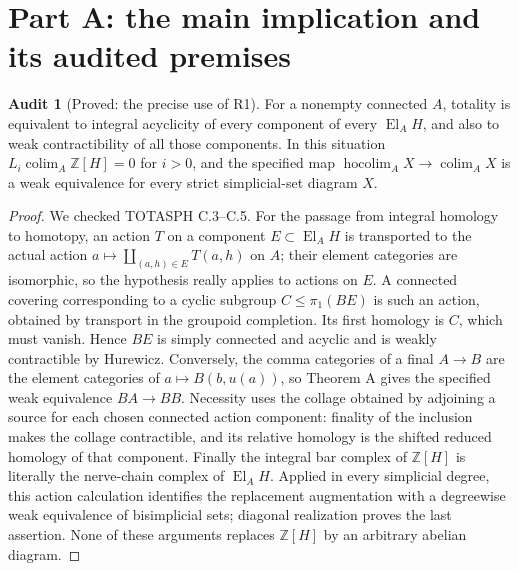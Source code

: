 \documentclass[11pt,a4paper]{article}
\newcommand{\Z}{\mathbb Z}
\newcommand{\El}{\operatorname{El}}
\newcommand{\colim}{\operatorname*{colim}}
\newcommand{\hocolim}{\operatorname*{hocolim}}
\theoremstyle{definition}
\newtheorem{audit}[theorem]{Audit}
\begin{document}
\section{Part A: the main implication and its audited premises}\label{sec:A}
\begin{audit}[Proved: the precise use of R1]\label{A:R1}
For a nonempty connected $A$, totality is equivalent to integral acyclicity of every component of every $\El_AH$, and also to weak contractibility of all those components. In this situation $L_i\colim_A\Z[H]=0$ for $i>0$, and the specified map $\hocolim_A X\to\colim_A X$ is a weak equivalence for every strict simplicial-set diagram $X$.
\end{audit}
\begin{proof}
We checked TOTASPH C.3--C.5. For the passage from integral homology to homotopy, an action $T$ on a component $E\subset\El_AH$ is transported to the actual action $a\mapsto\coprod_{(a,h)\in E}T(a,h)$ on $A$; their element categories are isomorphic, so the hypothesis really applies to actions on $E$. A connected covering corresponding to a cyclic subgroup $C\leq\pi_1(BE)$ is such an action, obtained by transport in the groupoid completion. Its first homology is $C$, which must vanish. Hence $BE$ is simply connected and acyclic and is weakly contractible by Hurewicz. Conversely, the comma categories of a final $A\to B$ are the element categories of $a\mapsto B(b,u(a))$, so Theorem A gives the specified weak equivalence $BA\to BB$. Necessity uses the collage obtained by adjoining a source for each chosen connected action component: finality of the inclusion makes the collage contractible, and its relative homology is the shifted reduced homology of that component. Finally the integral bar complex of $\Z[H]$ is literally the nerve-chain complex of $\El_AH$. Applied in every simplicial degree, this action calculation identifies the replacement augmentation with a degreewise weak equivalence of bisimplicial sets; diagonal realization proves the last assertion. None of these arguments replaces $\Z[H]$ by an arbitrary abelian diagram.
\end{proof}
\end{document}
